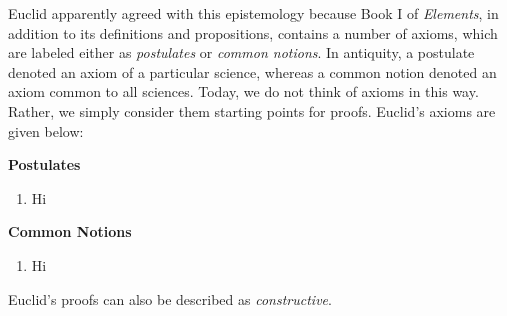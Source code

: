Euclid apparently agreed with this epistemology because Book I of \textit{Elements}, in addition to its definitions and propositions, contains a number of axioms, which are labeled either as \textit{postulates} or \textit{common notions}. In antiquity, a postulate denoted an axiom of a particular science, whereas a common notion denoted an axiom common to all sciences. Today, we do not think of axioms in this way. Rather, we simply consider them starting points for proofs. Euclid's axioms are given below: \\

\begin{center}
	\textbf{Postulates}
	\begin{enumerate}
		\item Hi
	\end{enumerate}
	\textbf{Common Notions}
	\begin{enumerate}
		\item Hi
	\end{enumerate}
	
\end{center}

Euclid's proofs can also be described as \textit{constructive}. \\





